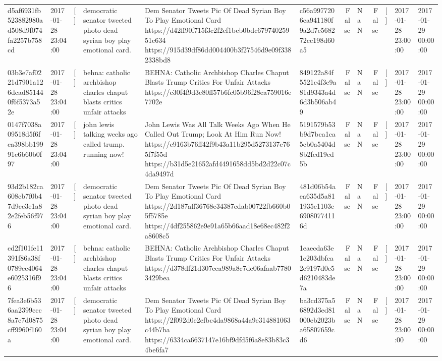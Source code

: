 \begin{tabular}{llllllrlrlll}
d5af6931fb523882980ad508d9f074fa2257b758cd & 2017-01-28 23:04:00 & [] & democratic senator tweeted photo dead syrian boy play emotional card. & Dem Senator Tweets Pic Of Dead Syrian Boy To Play Emotional Card https://d42ff90f715f3c2f2ef1bcb0bdc67974025951c634 https://915d39df86dd004400b3f27546d9e09f3382338bd8 & c56a9977206ea941180f9a2d7c568272cc198d60a5 & False & NaN & False & [] & 2017-01-28 23:00:00 & 2017-01-29 00:00:00 \\
03b3e7af0221d7901a126dcad851440f6f5373a52e & 2017-01-28 23:04:00 & [] & behna: catholic archbishop charles chaput blasts critics unfair attacks & BEHNA: Catholic Archbishop Charles Chaput Blasts Trump Critics For Unfair Attacks https://c30f4f9d3e80ff57b6fc05b96f28ea759016e7702e & 849122a84f5521c4f3c9a81d9343a4d6d3b506ab49 & False & NaN & False & [] & 2017-01-28 23:00:00 & 2017-01-29 00:00:00 \\
0147f7038a09518d5f6fca398bb19991e6b60b0f97 & 2017-01-28 23:04:00 & [] & john lewis talking weeks ago called trump. running now! & John Lewis Was All Talk Weeks Ago When He Called Out Trump; Look At Him Run Now! https://c9163b76ff42f9b43a11b295d5273137c765f7f55d https://b31d5e21652afd4491658dd5bd2d22c07c4da9497d & 5191579b53b9d7bca1ca5cb0a5404d8b2fcd19cd5b & False & NaN & False & [] & 2017-01-28 23:00:00 & 2017-01-29 00:00:00 \\
93d2b182ca608cb7f0b47d9ec3e1a82e2feb56f976 & 2017-01-28 23:04:00 & [] & democratic senator tweeted photo dead syrian boy play emotional card. & Dem Senator Tweets Pic Of Dead Syrian Boy To Play Emotional Card https://2d187aff36768e34387edab00722fb660b05f5785e https://4df255862e9e91a65b66aad18e68ec482f2a8608c5 & 481d06b54aea635d5a811935e1103e69080774116d & False & NaN & False & [] & 2017-01-28 23:00:00 & 2017-01-29 00:00:00 \\
cd2f101fe11391f86a38f0789ee4064e6025316f96 & 2017-01-28 23:04:00 & [] & behna: catholic archbishop charles chaput blasts critics unfair attacks & BEHNA: Catholic Archbishop Charles Chaput Blasts Trump Critics For Unfair Attacks https://d378df21d307eea989a8c7de06afaab77803429bea & 1eaecda63e1e203dbfca2e9197d0c5d6210483de7a & False & NaN & False & [] & 2017-01-28 23:00:00 & 2017-01-29 00:00:00 \\
7fea3e6b536aa2399ccc8a7e7d0875cff9960f160a & 2017-01-28 23:04:00 & [] & democratic senator tweeted photo dead syrian boy play emotional card. & Dem Senator Tweets Pic Of Dead Syrian Boy To Play Emotional Card https://2f092d0e2efbc4da9868a44a9e314881063c44b7ba https://6334ca6637147e16bf9dfd5f6a8e83b83c34be6fa7 & ba3cd375a56892d3ed81000eb2023ba65807659cd6 & False & NaN & False & [] & 2017-01-28 23:00:00 & 2017-01-29 00:00:00 \\

\end{tabular}
